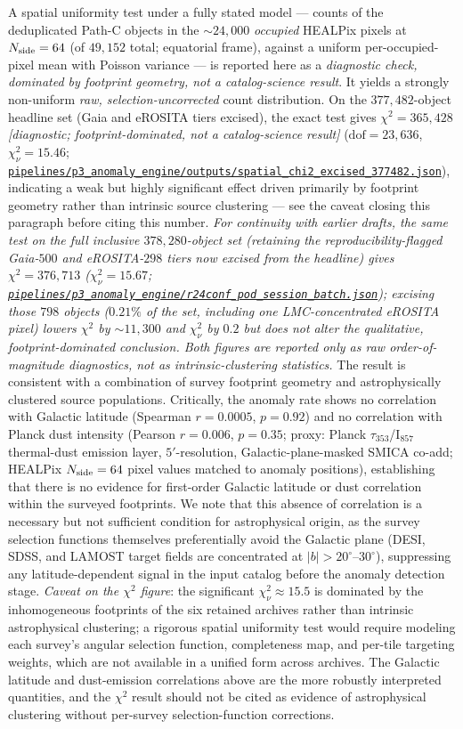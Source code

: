 \documentclass[aps,prd,twocolumn,superscriptaddress,showpacs,preprintnumbers,nofootinbib,longbibliography,floatfix]{revtex4-2}
\newcommand{\repoBase}{https://github.com/Hubify-Projects/bigbounce/blob/main}
\newcommand{\artifact}[1]{\href{\repoBase/#1}{\nolinkurl{#1}}}
\begin{document}
A spatial uniformity test under a fully stated model --- counts of the deduplicated Path-C objects in the $\sim\!24{,}000$ \emph{occupied} HEALPix pixels at $N_{\rm side} = 64$ (of $49{,}152$ total; equatorial frame), against a uniform per-occupied-pixel mean with Poisson variance --- is reported here as a \emph{diagnostic check, dominated by footprint geometry, not a catalog-science result}. It yields a strongly non-uniform \emph{raw, selection-uncorrected} count distribution. On the $377{,}482$-object headline set (Gaia and eROSITA tiers excised), the exact test gives $\chi^2 = 365{,}428$ \emph{[diagnostic; footprint-dominated, not a catalog-science result]} ($\text{dof} = 23{,}636$, $\chi^2_\nu = 15.46$; \artifact{pipelines/p3\_anomaly\_engine/outputs/spatial\_chi2\_excised\_377482.json}), indicating a weak but highly significant effect driven primarily by footprint geometry rather than intrinsic source clustering --- see the caveat closing this paragraph before citing this number. \emph{For continuity with earlier drafts, the same test on the full inclusive $378{,}280$-object set (retaining the reproducibility-flagged Gaia-$500$ and eROSITA-$298$ tiers now excised from the headline) gives $\chi^2 = 376{,}713$ ($\chi^2_\nu = 15.67$; \artifact{pipelines/p3\_anomaly\_engine/r24conf\_pod\_session\_batch.json}); excising those $798$ objects ($0.21\%$ of the set, including one LMC-concentrated eROSITA pixel) lowers $\chi^2$ by ${\sim}11{,}300$ and $\chi^2_\nu$ by $0.2$ but does not alter the qualitative, footprint-dominated conclusion. Both figures are reported only as raw order-of-magnitude diagnostics, not as intrinsic-clustering statistics.} The result is consistent with a combination of survey footprint geometry and astrophysically clustered source populations. Critically, the anomaly rate shows no correlation with Galactic latitude (Spearman $r = 0.0005$, $p = 0.92$) and no correlation with Planck dust intensity (Pearson $r = 0.006$, $p = 0.35$; proxy: Planck $\tau_{353}$/I$_{857}$ thermal-dust emission layer, $5'$-resolution, Galactic-plane-masked SMICA co-add; HEALPix $N_{\rm side}=64$ pixel values matched to anomaly positions), establishing that there is no evidence for first-order Galactic latitude or dust correlation within the surveyed footprints. We note that this absence of correlation is a necessary but not sufficient condition for astrophysical origin, as the survey selection functions themselves preferentially avoid the Galactic plane (DESI, SDSS, and LAMOST target fields are concentrated at $|b| > 20^\circ$--$30^\circ$), suppressing any latitude-dependent signal in the input catalog before the anomaly detection stage. \textit{Caveat on the $\chi^2$ figure}: the significant $\chi^2_\nu \approx 15.5$ is dominated by the inhomogeneous footprints of the six retained archives rather than intrinsic astrophysical clustering; a rigorous spatial uniformity test would require modeling each survey's angular selection function, completeness map, and per-tile targeting weights, which are not available in a unified form across archives. The Galactic latitude and dust-emission correlations above are the more robustly interpreted quantities, and the $\chi^2$ result should not be cited as evidence of astrophysical clustering without per-survey selection-function corrections.
\end{document}
